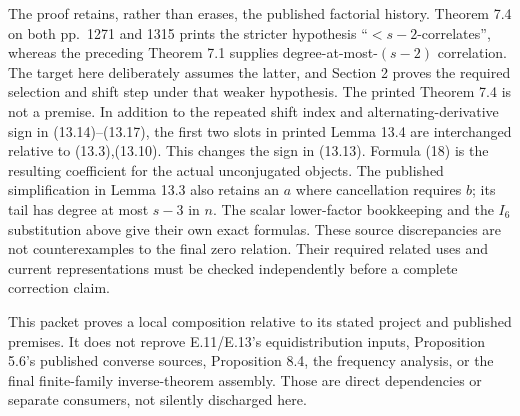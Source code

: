 \documentclass[11pt]{article}
\begin{document}
The proof retains, rather than erases, the published factorial history.
Theorem 7.4 on both pp.~1271 and 1315 prints the stricter hypothesis
``$<s-2$-correlates'', whereas the preceding Theorem 7.1 supplies
degree-at-most-$(s-2)$ correlation. The target here deliberately assumes
the latter, and Section 2 proves the required selection and shift step
under that weaker hypothesis. The printed Theorem 7.4 is not a premise.
In addition to the repeated shift index and alternating-derivative sign in
(13.14)--(13.17), the first two slots in printed Lemma 13.4 are interchanged
relative to (13.3),(13.10). This changes the sign in (13.13). Formula (18)
is the resulting coefficient for the actual unconjugated objects. The
published simplification in Lemma 13.3 also retains an $a$ where cancellation
requires $b$; its tail has degree at most $s-3$ in $n$. The scalar lower-factor
bookkeeping and the $I_6$ substitution above give their own exact formulas.
These source discrepancies are not counterexamples to the final zero relation.
Their required related uses and current representations must be checked
independently before a complete correction claim.

This packet proves a local composition relative to its stated project and
published premises. It does not reprove E.11/E.13's equidistribution inputs,
Proposition 5.6's published converse sources, Proposition 8.4, the frequency
analysis, or the final finite-family inverse-theorem assembly. Those are
direct dependencies or separate consumers, not silently discharged here.
\end{document}
